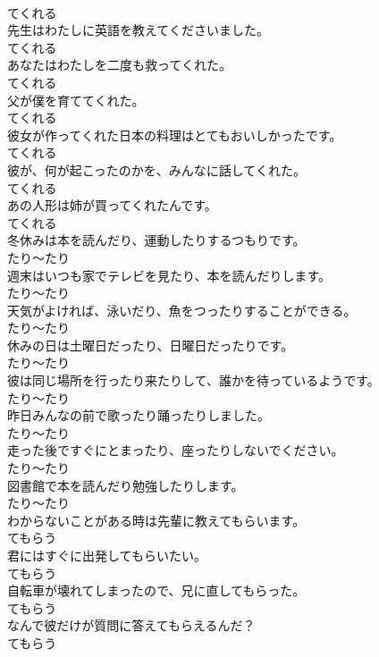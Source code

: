\documentclass[8pt]{extreport}
\begin{document}
\begin{CJK}{UTF8}{min}
\\	てくれる
\\	先生はわたしに英語を教えてくださいました。	
\\	てくれる
\\	あなたはわたしを二度も救ってくれた。	
\\	てくれる
\\	父が僕を育ててくれた。	
\\	てくれる
\\	彼女が作ってくれた日本の料理はとてもおいしかったです。	
\\	てくれる
\\	彼が、何が起こったのかを、みんなに話してくれた。	
\\	てくれる
\\	あの人形は姉が買ってくれたんです。	
\\	てくれる
\\	冬休みは本を読んだり、運動したりするつもりです。	
\\	たり～たり
\\	週末はいつも家でテレビを見たり、本を読んだりします。	
\\	たり～たり
\\	天気がよければ、泳いだり、魚をつったりすることができる。	
\\	たり～たり
\\	休みの日は土曜日だったり、日曜日だったりです。	
\\	たり～たり
\\	彼は同じ場所を行ったり来たりして、誰かを待っているようです。	
\\	たり～たり
\\	昨日みんなの前で歌ったり踊ったりしました。	
\\	たり～たり
\\	走った後ですぐにとまったり、座ったりしないでください。	
\\	たり～たり
\\	図書館で本を読んだり勉強したりします。	
\\	たり～たり
\\	わからないことがある時は先輩に教えてもらいます。	
\\	てもらう
\\	君にはすぐに出発してもらいたい。	
\\	てもらう
\\	自転車が壊れてしまったので、兄に直してもらった。	
\\	てもらう
\\	なんで彼だけが質問に答えてもらえるんだ？	
\\	てもらう

\end{CJK}
\end{document}
